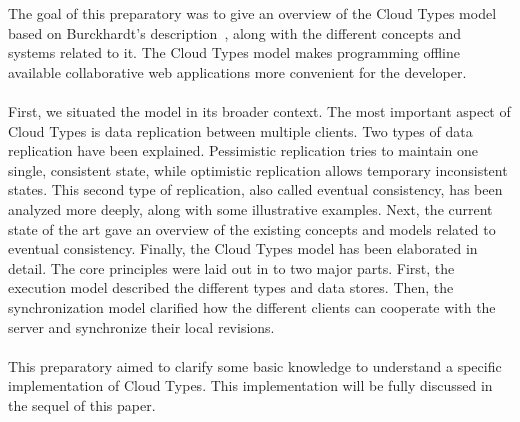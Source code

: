 \documentclass[a4paper,12pt]{report}
\begin{document}
The goal of this preparatory was to give an overview of the Cloud Types model based on Burckhardt's description~\cite{Burckhardt}, along with the different concepts and systems related to it. The Cloud Types model makes programming offline available collaborative web applications more convenient for the developer.\\ 
\\
First, we situated the model in its broader context. The most important aspect of Cloud Types is data replication between multiple clients. Two types of data replication have been explained. Pessimistic replication tries to maintain one single, consistent state, while optimistic replication allows temporary inconsistent states. This second type of replication, also called eventual consistency, has been analyzed more deeply, along with some illustrative examples. Next, the current state of the art gave an overview of the existing concepts and models related to eventual consistency. Finally, the Cloud Types model has been elaborated in detail. The core principles were laid out in to two major parts. First, the execution model described the different types and data stores. Then, the synchronization model clarified how the different clients can cooperate with the server and synchronize their local revisions.\\ 
\\
This preparatory aimed to clarify some basic knowledge to understand a specific implementation of Cloud Types. This implementation will be fully discussed in the sequel of this paper.


{}
\end{document}
